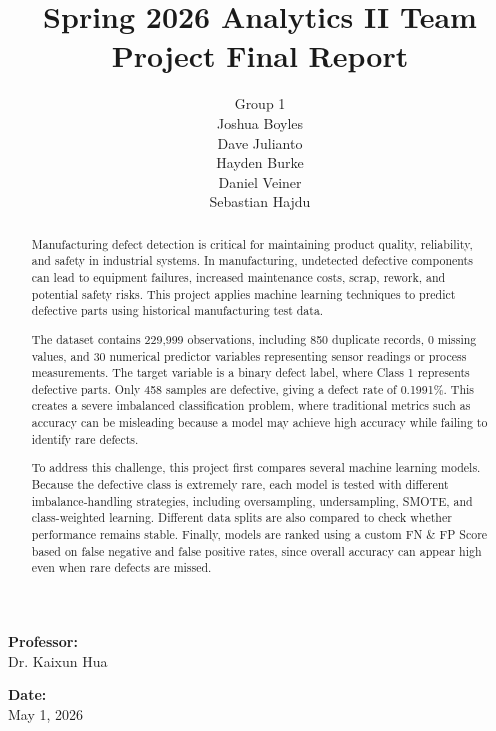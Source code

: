 \documentclass{article}
\title{Spring 2026 Analytics II Team Project Final Report}
\author{
  Group 1 \\[1ex]  %
  Joshua Boyles\\
  Dave Julianto\\
  Hayden Burke\\
  Daniel Veiner\\
  Sebastian Hajdu
}
\begin{document}
\maketitle

\vspace{2em}  %
\begin{center}
  \textbf{Professor:}\\[0.5em] Dr. Kaixun Hua
\end{center}

\vspace{2em}
\begin{center}
  {\textbf{Date:}}\\[0.5em]
  May 1, 2026
\end{center}

\newpage
\begin{abstract}
Manufacturing defect detection is critical for maintaining product quality,
reliability, and safety in industrial systems. In manufacturing, undetected
defective components can lead to equipment failures, increased maintenance
costs, scrap, rework, and potential safety risks. This project applies
machine learning techniques to predict defective parts using historical
manufacturing test data.

The dataset contains 229,999 observations, including 850 duplicate records,
0 missing values, and 30 numerical predictor variables representing sensor
readings or process measurements. The target variable is a binary defect
label, where Class 1 represents defective parts. Only 458 samples are
defective, giving a defect rate of 0.1991\%. This creates a severe
imbalanced classification problem, where traditional metrics such as
accuracy can be misleading because a model may achieve high accuracy while
failing to identify rare defects.

To address this challenge, this project first compares several machine learning models.
Because the defective class is extremely rare, each model is tested with
different imbalance-handling strategies, including oversampling, undersampling,
SMOTE, and class-weighted learning. Different data splits are also compared to 
check whether performance remains stable. 
Finally, models are ranked using a custom FN \& FP Score based on false
negative and false positive rates, since overall accuracy can appear high even
when rare defects are missed.

\end{abstract}
\end{document}
